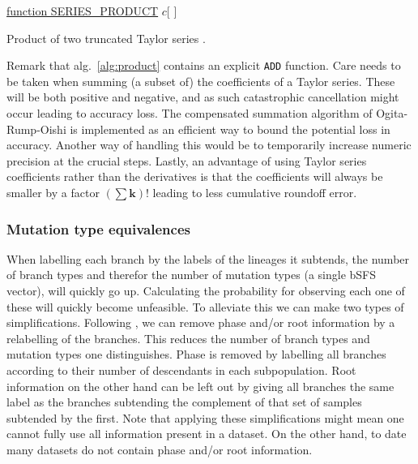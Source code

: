 \documentclass[10pt, a4]{article}
\begin{document}
\begin{algorithm}\label{alg:product}

    \underline{function SERIES\_PRODUCT}\;
    \Return $c$[ ]\;
    \caption{Product of two truncated Taylor series \citep{Neidinger2013}.}
\end{algorithm}

Remark that alg.\ \ref{alg:product} contains an explicit \texttt{ADD} function. Care needs to be taken when summing (a subset of) the coefficients of a Taylor series. These will be both positive and negative, and as such catastrophic cancellation might occur leading to accuracy loss. The compensated summation algorithm of Ogita-Rump-Oishi \citep{Ogita2005} is implemented as an efficient way to bound the potential loss in accuracy. Another way of handling this would be to temporarily increase numeric precision at the crucial steps. Lastly, an advantage of using Taylor series coefficients rather than the derivatives is that the coefficients will always be smaller by a factor $(\sum \boldsymbol{k})!$ leading to less cumulative roundoff error.


\subsubsection{Mutation type equivalences} %

When labelling each branch by the labels of the lineages it subtends, the number of branch types and therefor the number of mutation types (a single bSFS vector), will quickly go up. Calculating the probability for observing each one of these will quickly become unfeasible. To alleviate this we can make two types of simplifications. Following \citet{Lohse2016}, we can remove phase and/or root information by a relabelling of the branches. This reduces the number of branch types and mutation types one distinguishes. Phase is removed by labelling all branches according to their number of descendants in each subpopulation. Root information on the other hand can be left out by giving all branches the same label as the branches subtending the complement of that set of samples subtended by the first. Note that applying these simplifications might mean one cannot fully use all information present in a dataset. On the other hand, to date many datasets do not contain phase and/or root information.
\end{document}
